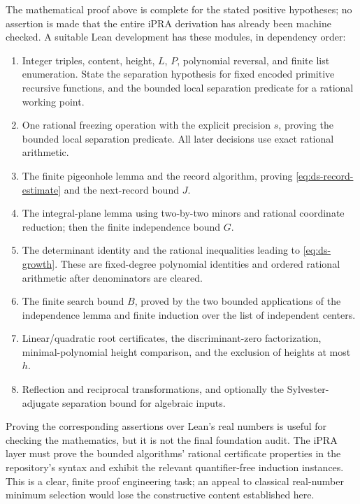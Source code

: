 The mathematical proof above is complete for the stated positive
hypotheses; no assertion is made that the entire iPRA derivation has
already been machine checked.  A suitable Lean development has these
modules, in dependency order:
\begin{enumerate}
 \item Integer triples, content, height, $L$, $P$, polynomial reversal,
       and finite list enumeration.  State the separation hypothesis for
       fixed encoded primitive recursive functions, and the bounded
       local separation predicate for a rational working point.
 \item One rational freezing operation with the explicit precision $s$,
       proving the bounded local separation predicate.  All later
       decisions use exact rational arithmetic.
 \item The finite pigeonhole lemma and the record algorithm, proving
       \eqref{eq:ds-record-estimate} and the next-record bound $J$.
 \item The integral-plane lemma using two-by-two minors and rational
       coordinate reduction; then the finite independence bound $G$.
 \item The determinant identity and the rational inequalities leading
       to \eqref{eq:ds-growth}.  These are fixed-degree polynomial
       identities and ordered rational arithmetic after denominators
       are cleared.
 \item The finite search bound $B$, proved by the two bounded
       applications of the independence lemma and finite induction over
       the list of independent centers.
 \item Linear/quadratic root certificates, the discriminant-zero
       factorization, minimal-polynomial height comparison, and the
       exclusion of heights at most $h$.
 \item Reflection and reciprocal transformations, and optionally the
       Sylvester-adjugate separation bound for algebraic inputs.
\end{enumerate}
Proving the corresponding assertions over Lean's real numbers is useful
for checking the mathematics, but it is not the final foundation audit.
The iPRA layer must prove the bounded algorithms' rational certificate
properties in the repository's syntax and exhibit the relevant
quantifier-free induction instances.  This is a clear, finite proof
engineering task; an appeal to classical real-number minimum selection
would lose the constructive content established here.

